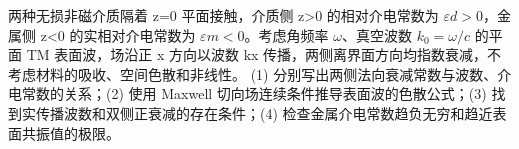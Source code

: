 两种无损非磁介质隔着 z=0 平面接触，介质侧 z>0 的相对介电常数为 \(\varepsilon d>0\)，金属侧 z<0 的实相对介电常数为 \(\varepsilon m<0\)。考虑角频率 \(\omega \)、真空波数 \(k_{0}=\omega /c\) 的平面 TM 表面波，场沿正 x 方向以波数 kx 传播，两侧离界面方向均指数衰减，不考虑材料的吸收、空间色散和非线性。
(1) 分别写出两侧法向衰减常数与波数、介电常数的关系；(2) 使用 Maxwell 切向场连续条件推导表面波的色散公式；(3) 找到实传播波数和双侧正衰减的存在条件；(4) 检查金属介电常数趋负无穷和趋近表面共振值的极限。
